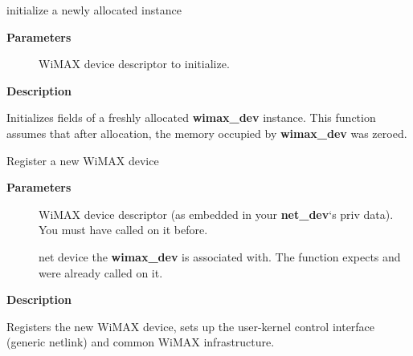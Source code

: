 \documentclass[a4paper,8pt,english]{sphinxmanual}
\begin{document}
\begin{fulllineitems}
\label{networking/kapi:c.wimax_dev_init}
initialize a newly allocated instance

\end{fulllineitems}


\textbf{Parameters}
\begin{description}
\item[{}] \leavevmode
WiMAX device descriptor to initialize.

\end{description}

\textbf{Description}

Initializes fields of a freshly allocated \textbf{wimax\_dev} instance. This
function assumes that after allocation, the memory occupied by
\textbf{wimax\_dev} was zeroed.

\begin{fulllineitems}
\label{networking/kapi:c.wimax_dev_add}
Register a new WiMAX device

\end{fulllineitems}


\textbf{Parameters}
\begin{description}
\item[{}] \leavevmode
WiMAX device descriptor (as embedded in your \textbf{net\_dev}`s
priv data). You must have called {\hyperref[networking/kapi:c.wimax_dev_init]{\emph{}}} on it before.

\item[{}] \leavevmode
net device the \textbf{wimax\_dev} is associated with. The
function expects  and {\hyperref[networking/kapi:c.register_netdev]{\emph{}}} were
already called on it.

\end{description}

\textbf{Description}

Registers the new WiMAX device, sets up the user-kernel control
interface (generic netlink) and common WiMAX infrastructure.
\end{document}

